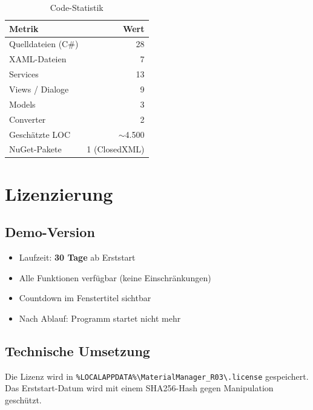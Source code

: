 \documentclass[a4paper,12pt]{article}
\begin{document}
\begin{table}[h]
\centering
\begin{tabular}{l r}
\toprule
\textbf{Metrik} & \textbf{Wert} \\
\midrule
Quelldateien (C\#) & 28 \\
XAML-Dateien & 7 \\
Services & 13 \\
Views / Dialoge & 9 \\
Models & 3 \\
Converter & 2 \\
Geschätzte LOC & $\sim$4.500 \\
NuGet-Pakete & 1 (ClosedXML) \\
\bottomrule
\end{tabular}
\caption{Code-Statistik}
\end{table}

\section{Lizenzierung}

\subsection{Demo-Version}

\begin{warnbox}
\begin{itemize}
    \item Laufzeit: \textbf{30 Tage} ab Erststart
    \item Alle Funktionen verfügbar (keine Einschränkungen)
    \item Countdown im Fenstertitel sichtbar
    \item Nach Ablauf: Programm startet nicht mehr
\end{itemize}
\end{warnbox}

\subsection{Technische Umsetzung}

Die Lizenz wird in \texttt{\%LOCALAPPDATA\%\textbackslash MaterialManager\_R03\textbackslash .license} gespeichert. Das Erststart-Datum wird mit einem SHA256-Hash gegen Manipulation geschützt.

\end{document}
